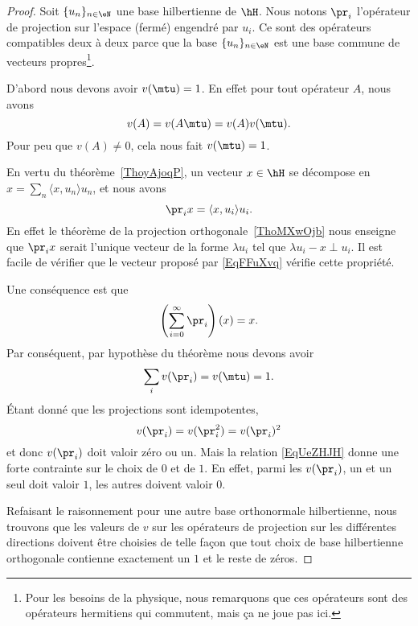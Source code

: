\begin{proof}
	Soit \( \{ u_n \}_{n\in \eN}\) une base hilbertienne de \( \hH\). Nous notons \( \pr_i\) l'opérateur de projection sur l'espace (fermé) engendré par \( u_i\). Ce sont des opérateurs compatibles deux à deux parce que la base \( \{ u_n \}_{n\in \eN}\) est une base commune de vecteurs propres\footnote{Pour les besoins de la physique, nous remarquons que ces opérateurs sont des opérateurs hermitiens qui commutent, mais ça ne joue pas ici.}.

	D'abord nous devons avoir \( v(\mtu)=1\). En effet pour tout opérateur \( A\), nous avons
	\begin{equation}
		v(A)=v(A\mtu)=v(A)v(\mtu).
	\end{equation}
	Pour peu que \( v(A)\neq 0\), cela nous fait \( v(\mtu)=1\).

	En vertu du théorème~\ref{ThoyAjoqP}, un vecteur \( x\in\hH\) se décompose en \( x=\sum_n\langle x, u_n\rangle u_n\), et nous avons
	\begin{equation}    \label{EqFFuXvq}
		\pr_ix=\langle x, u_i\rangle u_i.
	\end{equation}
	En effet le théorème de la projection orthogonale~\ref{ThoMXwOjb} nous enseigne que \( \pr_ix\) serait l'unique vecteur de la forme \( \lambda u_i\) tel que \( \lambda u_i-x\perp u_i\). Il est facile de vérifier que le vecteur proposé par \eqref{EqFFuXvq} vérifie cette propriété.

	Une conséquence est que
	\begin{equation}
		\left( \sum_{i=0}^{\infty}\pr_i \right)(x)=x.
	\end{equation}
	Par conséquent, par hypothèse du théorème nous devons avoir
	\begin{equation}    \label{EqUeZHJH}
		\sum_iv(\pr_i)=v(\mtu)=1.
	\end{equation}
	Étant donné que les projections sont idempotentes,
	\begin{equation}
		v(\pr_i)=v(\pr_i^2)=v(\pr_i)^2
	\end{equation}
	et donc \( v(\pr_i)\) doit valoir zéro ou un. Mais la relation \eqref{EqUeZHJH} donne une forte contrainte sur le choix de \( 0\) et de \( 1\). En effet, parmi les \( v(\pr_i)\), un et un seul doit valoir \( 1\), les autres doivent valoir \( 0\).

	Refaisant le raisonnement pour une autre base orthonormale hilbertienne, nous trouvons que les valeurs de \( v\) sur les opérateurs de projection sur les différentes directions doivent être choisies de telle façon que tout choix de base hilbertienne orthogonale contienne exactement un \( 1\) et le reste de zéros.


\end{proof}
